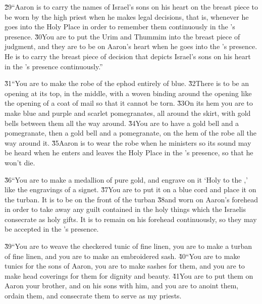 \v{29}``Aaron is to carry the names of Israel's sons on his heart on the breast piece to be worn by the high priest when he makes legal decisions, that is, whenever he goes into the Holy Place in order to remember them continuously in the 's presence. \v{30}You are to put the Urim and Thummim into the breast piece of judgment, and they are to be on Aaron's heart when he goes into the 's presence. He is to carry the breast piece of decision that depicts Israel's sons on his heart in the 's presence continuously.''

\v{31}``You are to make the robe of the ephod entirely of blue. \v{32}There is to be an opening at its top, in the middle, with a woven binding around the opening like the opening of a coat of mail so that it cannot be torn. \v{33}On its hem you are to make blue and purple and scarlet pomegranates, all around the skirt, with gold bells between them all the way around. \v{34}You are to have a gold bell and a pomegranate, then a gold bell and a pomegranate, on the hem of the robe all the way around it. \v{35}Aaron is to wear the robe when he ministers so its sound may be heard when he enters and leaves the Holy Place in the 's presence, so that he won't die.

\v{36}``You are to make a medallion of pure gold, and engrave on it `Holy to the ,' like the engravings of a signet. \v{37}You are to put it on a blue cord and place it on the turban. It is to be on the front of the turban \v{38}and worn on Aaron's forehead in order to take away any guilt contained in the holy things which the Israelis consecrate as holy gifts. It is to remain on his forehead continuously, so they may be accepted in the 's presence.

\v{39}``You are to weave the checkered tunic of fine linen, you are to make a turban of fine linen, and you are to make an embroidered sash. \v{40}``You are to make tunics for the sons of Aaron, you are to make sashes for them, and you are to make head coverings for them for dignity and beauty. \v{41}You are to put them on Aaron your brother, and on his sons with him, and you are to anoint them, ordain them, and consecrate them to serve as my priests.

